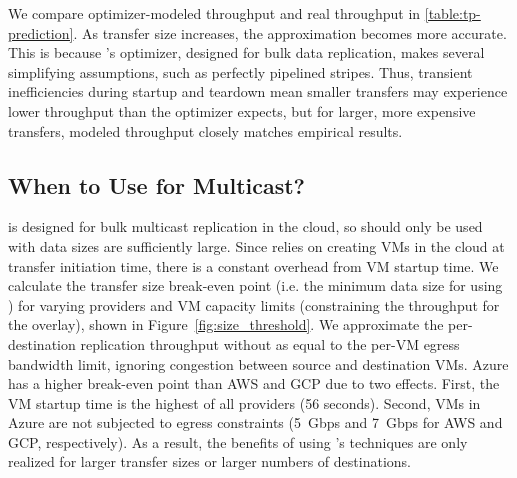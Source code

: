 We compare optimizer-modeled throughput and real throughput in \cref{table:tp-prediction}.
As transfer size increases, the approximation becomes more accurate.
This is because \sys's optimizer, designed for bulk data replication, makes several simplifying assumptions, such as perfectly pipelined stripes.
Thus, transient inefficiencies during startup and teardown mean smaller transfers may experience lower throughput than the optimizer expects, but for larger, more expensive transfers, modeled throughput closely matches empirical results.


\subsection{When to Use \sys for Multicast?}
\sys is designed for bulk multicast replication in the cloud, so should only be used with data sizes are sufficiently large. Since \sys relies on creating VMs in the cloud at transfer initiation time, there is a constant overhead from VM startup time. We calculate the transfer size break-even point (i.e. the minimum data size for using \sys{}) for varying providers and VM capacity limits (constraining the throughput for the \sys overlay), shown in Figure~\ref{fig:size_threshold}. We approximate the per-destination replication throughput without \sys as equal to the per-VM egress bandwidth limit, ignoring congestion between source and destination VMs. Azure has a higher break-even point than AWS and GCP due to two effects. First, the VM startup time is the highest of all providers (56 seconds). Second, VMs in Azure are not subjected to egress constraints (5\ Gbps and 7\ Gbps for AWS and GCP, respectively). As a result, the benefits of using \sys's techniques are only realized for larger transfer sizes or larger numbers of destinations. 


